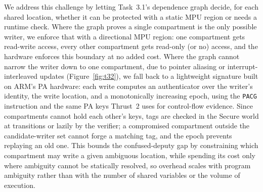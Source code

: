 We address this challenge by letting Task~3.1's dependence graph decide, for each shared location, whether it can be protected with a static MPU region or needs a runtime check.
Where the graph proves a single compartment is the only possible writer, we enforce that with a directional MPU region: one compartment gets read-write access, every other compartment gets read-only (or no) access, and the hardware enforces this boundary at no added cost.
Where the graph cannot narrow the writer down to one compartment, due to pointer aliasing or interrupt-interleaved updates (Figure~\ref{fig:t32}), we fall back to a lightweight signature built on ARM's PA hardware: each write computes an authenticator over the writer's identity, the write location, and a monotonically increasing epoch, using the \texttt{PACG} instruction and the same PA keys Thrust~2 uses for control-flow evidence.
Since compartments cannot hold each other's keys, tags are checked in the Secure world at transitions or lazily by the verifier; a compromised compartment outside the candidate-writer set cannot forge a matching tag, and the epoch prevents replaying an old one.
This bounds the confused-deputy gap by constraining which compartment may write a given ambiguous location, while spending its cost only where ambiguity cannot be statically resolved, so overhead scales with program ambiguity rather than with the number of shared variables or the volume of execution.

